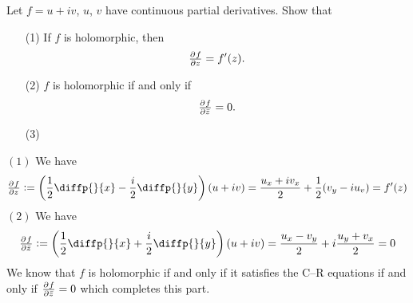 \documentclass[11pt,a4paper]{article}
\begin{document}
\begin{exercise}
  Let $f = u + i v$, $u$, $v$ have continuous partial derivatives.
  Show that
  \begin{enumerate}
    \item[(1)] If $f$ is holomorphic, then
      \[
        \pd{f}{z} = f'(z).
      \]
    \item[(2)] $f$ is holomorphic if and only if
      \[
        \pd{f}{\bar z} = 0.
      \]
    \item[(3)]
  \end{enumerate}
\end{exercise}
\begin{solution}
  $(1)$ We have
  \[
    \pd{f}{z} :=
    \del{\half \diffp{}{x} - \frac{i}{2} \diffp{}{y}} (u + i v) =
    \frac{u_x + i v_x}{2} + \half (v_y - i u_v) = 
    f'(z)
  \]
  $(2)$ We have
  \[
    \pd{f}{\bar z} :=
    \del{\half \diffp{}{x} + \frac{i}{2} \diffp{}{y}} (u + i v) =
    \frac{u_x - v_y}{2} + i \frac{u_y + v_x}{2} = 0
  \]
  We know that $f$ is holomorphic if and only if it satisfies the C--R
  equations if and only if $\pd{f}{\bar z} = 0$ which completes this part.
\end{solution}
\end{document}
